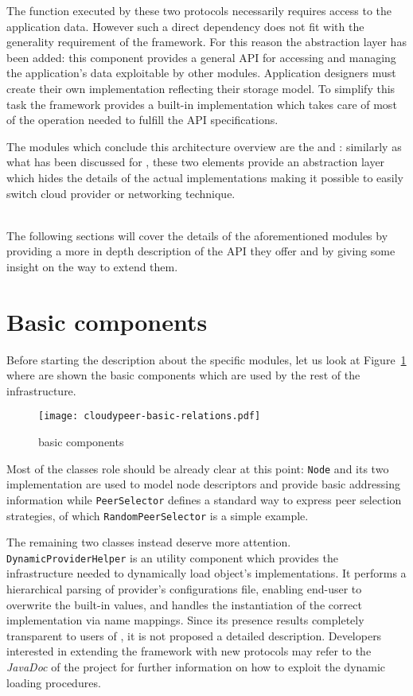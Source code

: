 The function executed by these two protocols necessarily requires
access to the application data. However such a direct dependency
does not fit with
the generality requirement of the framework. For this reason the
\store abstraction layer has been added: this component provides a general
API for accessing and managing the application's data exploitable by
other modules.
Application designers must create their own \store implementation
reflecting their storage model. To simplify this task the framework
provides a built-in implementation which takes care of most of the
operation needed to fulfill the API specifications.

The modules which conclude this architecture overview are the
\cloudhelper and \networkhelper: similarly as what has been discussed for
\grapes, these two elements provide an abstraction layer which hides
the details of the actual implementations making it possible
to easily switch cloud provider or networking technique.

\ \\
The following sections will cover the details of the aforementioned
modules by providing a more in depth description of the API they
offer and by giving some insight on the way to extend them.

\section{Basic components}
Before starting the description about the specific modules, let us look
at Figure~\ref{fig:cloudypeer-basic-relations} where are shown the
basic components which are used by the rest of the \cloudypeer
infrastructure.

\begin{figure}[h!]
  \centering
  \texttt{[image: cloudypeer-basic-relations.pdf]}
  \caption{\cloudypeer basic components}
  \label{fig:cloudypeer-basic-relations}
\end{figure}

Most of the classes role should be already clear at this point:
\texttt{Node} and its two implementation are used to model
node descriptors and provide basic addressing information while
\texttt{PeerSelector} defines a standard way to express
peer selection strategies, of which \texttt{RandomPeerSelector} is a
simple example.

The remaining two classes instead deserve more attention.
\texttt{DynamicProviderHelper} is an utility component which
provides the infrastructure needed to dynamically load object's
implementations. It performs a hierarchical parsing of provider's
configurations file, enabling end-user to overwrite the built-in
values, and handles the instantiation of the correct
implementation via name mappings. Since its presence results completely
transparent to users of \cloudypeer, it is not proposed a detailed
description. Developers interested in extending the
framework with new protocols may refer to the \emph{JavaDoc} of the project
for further information on how to exploit the dynamic loading procedures.

